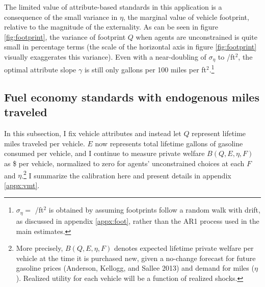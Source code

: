 \documentclass[12pt]{article}
\begin{document}
The limited value of attribute-based standards in this application is a consequence of the small variance in $\eta$, the marginal value of vehicle footprint, relative to the magnitude of the externality. As can be seen in figure \ref{fig:footprint}, the variance of footprint $Q$ when agents are unconstrained is quite small in percentage terms (the scale of the horizontal axis in figure \ref{fig:footprint} visually exaggerates this variance). Even with a near-doubling of $\sigma_\eta$ to \unskip /ft$^2$, the optimal attribute slope $\gamma$ is still only gallons per 100 miles per ft$^2$.\footnote{$\sigma_\eta=$ \unskip /ft$^2$ is obtained by assuming footprints follow a random walk with drift, as discussed in appendix \ref{appx:foot}, rather than the AR1 process used in the main estimates.}



\subsection{Fuel economy standards with endogenous miles traveled} \label{sec:vmt}
In this subsection, I fix vehicle attributes and instead let $Q$ represent lifetime miles traveled per vehicle. $E$ now represents total lifetime gallons of gasoline consumed per vehicle, and I continue to measure private welfare $B(Q,E,\eta,F)$ as \$ per vehicle, normalized to zero for agents' unconstrained choices at each $F$ and $\eta$.\footnote{More precisely, $B(Q,E,\eta,F)$ denotes expected lifetime private welfare per vehicle at the time it is purchased new, given a no-change forecast for future gasoline prices (Anderson, Kellogg, and Sallee 2013) and demand for miles ($\eta$). Realized utility for each vehicle will be a function of realized shocks.} I summarize the calibration here and present details in appendix \ref{appx:vmt}.
\end{document}
